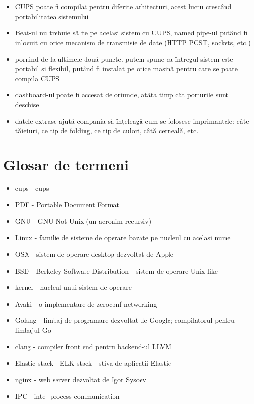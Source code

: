 \documentclass[a4paper, 12pt, twoside]{report}
\begin{document}
{\begin{itemize}
	\item CUPS poate fi compilat pentru diferite arhitecturi, acest lucru crescând portabilitatea sistemului
	\item Beat-ul nu trebuie să fie pe același sistem cu CUPS, named pipe-ul putând fi inlocuit cu orice mecanism de transmisie de date (HTTP POST, sockets, etc.)
	\item pornind de la ultimele două puncte, putem spune ca întregul sistem este portabil si flexibil, putând fi instalat pe orice mașină pentru care se poate compila CUPS
	\item dashboard-ul poate fi accesat de oriunde, atâta timp cât porturile sunt deschise
	\item datele extrase ajută compania să înțeleagă cum se folosesc imprimantele: câte tăieturi, ce tip de folding, ce tip de culori, câtă cerneală, etc.
\end{itemize}

\newpage\null\thispagestyle{empty}\newpage

\chapter{Glosar de termeni}
\begin{itemize}
\item \acrshort{cups} - \acrlong{cups}
\item PDF - Portable Document Format
\item GNU - GNU Not Unix (un acronim recursiv)
\item Linux - familie de sisteme de operare bazate pe nucleul cu același nume
\item OSX - sistem de operare desktop dezvoltat de Apple
\item BSD - Berkeley Software Distribution - sistem de operare Unix-like
\item kernel - nucleul unui sistem de operare
\item Avahi - o implementare de zeroconf networking
\item Golang - limbaj de programare dezvoltat de Google; compilatorul pentru limbajul Go
\item clang - compiler front end pentru backend-ul LLVM
\item Elastic stack - ELK stack - stiva de aplicatii Elastic
\item nginx - web server dezvoltat de Igor Sysoev
\item IPC - inte- process communication
\end{itemize}

}
\end{document}
